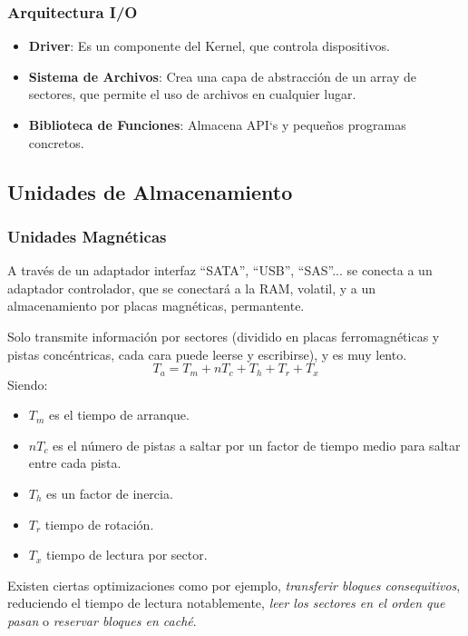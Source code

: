 \subsubsection{Arquitectura I/O}
\begin{itemize}
        \item \textbf{Driver}: Es un componente del Kernel, que controla dispositivos.
        \item \textbf{Sistema de Archivos}: Crea una capa de abstracción de un array de sectores, que permite el uso de archivos en cualquier lugar.
        \item \textbf{Biblioteca de Funciones}: Almacena API`s y pequeños programas concretos.
\end{itemize}
\subsection{Unidades de Almacenamiento}
\subsubsection{Unidades Magnéticas}
A través de un adaptador interfaz ``SATA'', ``USB'', ``SAS''... se conecta a un adaptador controlador, que se conectará a la RAM, volatil, y a un almacenamiento por placas magnéticas, permantente.
\par  Solo transmite información por sectores (dividido en placas ferromagnéticas y pistas concéntricas, cada cara puede leerse y escribirse), y es muy lento.
\[
        \boxed{T_a = T_m + nT_c + T_h + T_r + T_x}
\]
Siendo:
\begin{itemize}
        \item \(T_m\) es el tiempo de arranque.
        \item \(nT_c\) es el número de pistas a saltar por un factor de tiempo medio para saltar entre cada pista.
        \item \(T_h\) es un factor de inercia.
        \item \(T_r\) tiempo de rotación.
        \item \(T_x\) tiempo de lectura por sector.
\end{itemize}
Existen ciertas optimizaciones como por ejemplo, \textit{transferir bloques consequitivos}, reduciendo el tiempo de lectura notablemente, \textit{leer los sectores en el orden que pasan} o \textit{reservar bloques en caché}.
